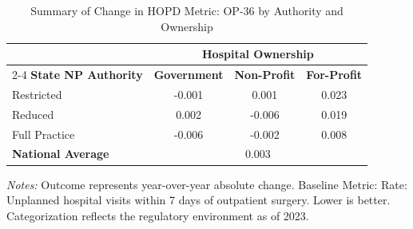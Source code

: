 \begin{table}[htbp]
    \centering
    \caption{Summary of Change in HOPD Metric: OP-36 by Authority and Ownership}
    \label{tab:d_hopd_op_36_own}
    \vspace{0.2cm}
    \begin{tabular}{lccc}
        \toprule
        & \multicolumn{3}{c}{\textbf{Hospital Ownership}} \\
        \cmidrule(lr){2-4}
        \textbf{State NP Authority} & \textbf{Government} & \textbf{Non-Profit} & \textbf{For-Profit} \\
        \midrule
        Restricted & -0.001 & 0.001 & 0.023 \\
        Reduced & 0.002 & -0.006 & 0.019 \\
        Full Practice & -0.006 & -0.002 & 0.008 \\
        \midrule
        \textbf{National Average} & \multicolumn{3}{c}{0.003} \\
        \bottomrule
    \end{tabular}
    \vspace{0.1cm}
    \begin{minipage}{0.85\textwidth}
        \footnotesize \textit{Notes:} Outcome represents year-over-year absolute change. Baseline Metric: Rate: Unplanned hospital visits within 7 days of outpatient surgery. Lower is better. Categorization reflects the regulatory environment as of 2023.
    \end{minipage}
\end{table}